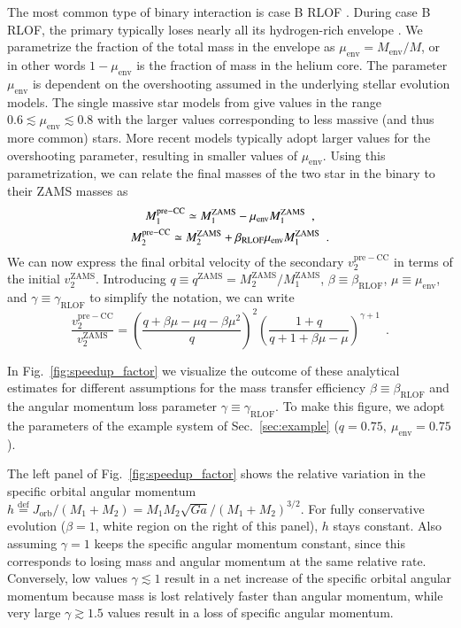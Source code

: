 \documentclass{aa}
\newcommand{\udef}{\stackrel{\mathrm{def}}{=}}
\DeclareRobustCommand{\Figref}[1]{Fig.~\ref{#1}}
\DeclareRobustCommand{\Secref}[1]{Sec.~\ref{#1}}
\begin{document}
The most common type of binary interaction is case B RLOF \citep[][]{kippenhahn:67}.
During case B RLOF, the primary typically loses nearly all its hydrogen-rich envelope
\citep[][]{gotberg:17,yoon:17, gotberg:18}. We parametrize the
fraction of the total mass in the envelope as $\mu_\mathrm{env} =
M_\mathrm{env}/M$, or in other words $1-\mu_\mathrm{env}$ is the fraction of mass in the
helium core. The parameter $\mu_\mathrm{env}$ is dependent on
the overshooting assumed in the underlying stellar evolution
models. The single massive star models from \cite{pols:98} give 
values in the range $0.6\lesssim\mu_\mathrm{env}\lesssim 0.8$ with the larger values
corresponding to less massive (and thus more common) stars. More
recent models \citep[e.g.][]{brott:11} typically adopt larger values
for the overshooting parameter, resulting in smaller values of $\mu_\mathrm{env}$.
Using this parametrization, we can relate the final masses of the two star in
the binary to their ZAMS masses as 
\begin{multline}
  \label{eq:DM}
 M_1^\mathrm{pre-CC} \simeq M_1^\mathrm{ZAMS}-\mu_\mathrm{env} M_1^\mathrm{ZAMS} \
 \ , \\
 M_2^\mathrm{pre-CC} \simeq M_2^\mathrm{ZAMS} +
 \beta_\mathrm{RLOF}\mu_\mathrm{env}M_1^\mathrm{ZAMS}
 \ \ . \hfill
\end{multline}
We can now express the final orbital velocity of the secondary $v_2^\mathrm{pre-CC}$ in
terms of the initial $v_2^\mathrm{ZAMS}$. Introducing $q\equiv q^\mathrm{ZAMS} =
M_2^\mathrm{ZAMS}/M_1^\mathrm{ZAMS}$,
$\beta\equiv\beta_\mathrm{RLOF}$, $\mu\equiv\mu_\mathrm{env}$, and
$\gamma\equiv\gamma_\mathrm{RLOF}$ to simplify the notation, we can write
\begin{equation}
  \label{eq:speedupdown}
  \frac{v_2^\mathrm{pre-CC}}{v_2^\mathrm{ZAMS}}=\left(\frac{q+\beta\mu-\mu
      q-\beta\mu^2}{q}\right)^2
  \left(\frac{1+q}{q+1+\beta\mu-\mu}\right)^{\gamma+1} \ \ .
\end{equation}

 In \Figref{fig:speedup_factor} we visualize the outcome of these
 analytical estimates for different assumptions for the mass transfer
 efficiency $\beta\equiv\beta_\mathrm{RLOF}$ and the angular momentum loss
 parameter $\gamma\equiv\gamma_\mathrm{RLOF}$. To make this figure, we adopt the parameters of the example system of
 \Secref{sec:example} ($q=0.75,\ \mu_\mathrm{env}=0.75$).

 The left panel of \Figref{fig:speedup_factor} shows the relative
 variation in the specific orbital angular momentum \mbox{$h\udef
 J_\mathrm{orb}/(M_1+M_2)=M_1M_2\sqrt{Ga}/(M_1+M_2)^{3/2}$}. For fully conservative evolution
 ($\beta=1$, white region on the right of this panel), $h$ stays
 constant. Also assuming $\gamma=1$ \citep[e.g.,][]{dominik:12} keeps
 the specific angular momentum constant, since this corresponds to
 losing mass and angular momentum at the same relative
 rate. Conversely, low values $\gamma\lesssim1$ result in a
 net increase of the specific orbital angular momentum because mass is
 lost relatively faster than angular momentum, while very large
 $\gamma\gtrsim 1.5$ values result in a loss of specific
 angular momentum.
\end{document}

